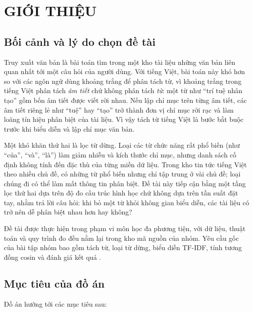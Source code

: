 \chapter{GIỚI THIỆU}

\section{Bối cảnh và lý do chọn đề tài}

Truy xuất văn bản là bài toán tìm trong một kho tài liệu những văn bản liên quan
nhất tới một câu hỏi của người dùng. Với tiếng Việt, bài toán này khó hơn so với
các ngôn ngữ dùng khoảng trắng để phân tách từ, vì khoảng trắng trong tiếng Việt
phân tách \emph{âm tiết} chứ không phân tách \emph{từ}: một từ như ``trí tuệ nhân
tạo'' gồm bốn âm tiết được viết rời nhau. Nếu lập chỉ mục trên từng âm tiết, các
âm tiết riêng lẻ như ``tuệ'' hay ``tạo'' trở thành đơn vị chỉ mục rời rạc và làm
loãng tín hiệu phân biệt của tài liệu. Vì vậy tách từ tiếng Việt là bước bắt buộc
trước khi biểu diễn và lập chỉ mục văn bản.

Một khó khăn thứ hai là lọc từ dừng. Loại các từ chức năng rất phổ biến (như
``của'', ``và'', ``là'') làm giảm nhiễu và kích thước chỉ mục, nhưng danh sách
cố định không tính đến đặc thù của từng miền dữ liệu. Trong kho tin tức tiếng
Việt theo nhiều chủ đề, có những từ phổ biến nhưng chỉ tập trung ở vài chủ đề;
loại chúng đi có thể làm mất thông tin phân biệt. Đề tài này tiếp cận bằng một
tầng lọc thứ hai dựa trên độ đo cấu trúc hình học chứ không dựa trên tần suất đặt
tay, nhằm trả lời câu hỏi: khi bỏ một từ khỏi không gian biểu diễn, các tài liệu
có trở nên dễ phân biệt nhau hơn hay không?

Đề tài được thực hiện trong phạm vi môn học đa phương tiện, với dữ liệu, thuật
toán và quy trình đo đều nằm lại trong kho mã nguồn của nhóm. Yêu cầu gốc của bài
tập nhóm bao gồm tách từ, loại từ dừng, biểu diễn TF-IDF, tính tương đồng cosin
và đánh giá kết quả \cite{baigiang}.

\section{Mục tiêu của đồ án}

Đồ án hướng tới các mục tiêu sau:

